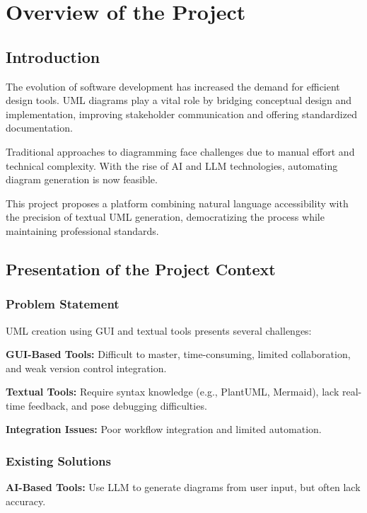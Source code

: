 \chapter[Overview]{Overview of the Project}

\section{Introduction}

The evolution of software development has increased the demand for efficient design tools. UML diagrams play a vital role by bridging conceptual design and implementation, improving stakeholder communication and offering standardized documentation.

Traditional approaches to diagramming face challenges due to manual effort and technical complexity. With the rise of AI and LLM technologies, automating diagram generation is now feasible.

This project proposes a platform combining natural language accessibility with the precision of textual UML generation, democratizing the process while maintaining professional standards.

\section{Presentation of the Project Context}

\subsection{Problem Statement}

UML creation using GUI and textual tools presents several challenges:

\textbf{GUI-Based Tools:} Difficult to master, time-consuming, limited collaboration, and weak version control integration.

\textbf{Textual Tools:} Require syntax knowledge (e.g., PlantUML, Mermaid), lack real-time feedback, and pose debugging difficulties.

\textbf{Integration Issues:} Poor workflow integration and limited automation.

\subsection{Existing Solutions}

\textbf{AI-Based Tools:} Use LLM to generate diagrams from user input, but often lack accuracy.

